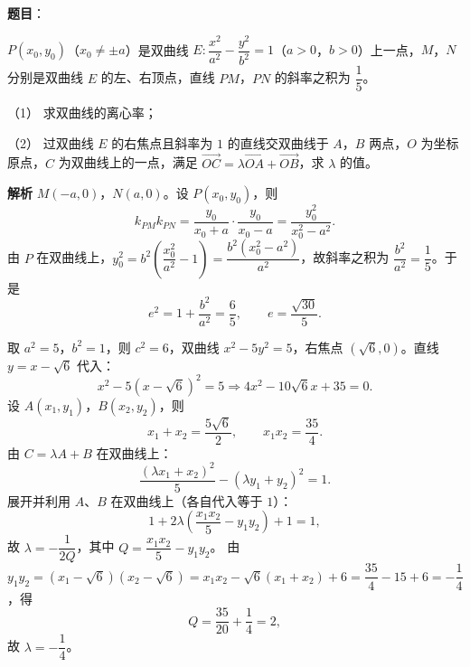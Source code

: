 \begin{answer}

\textbf{题目}：

$P(x_0,y_0)$（$x_0\neq\pm a$）是双曲线 $E:\dfrac{x^2}{a^2}-\dfrac{y^2}{b^2}=1$（$a>0$，$b>0$）上一点，$M$，$N$ 分别是双曲线 $E$ 的左、右顶点，直线 $PM$，$PN$ 的斜率之积为 $\dfrac15$。

（1） 求双曲线的离心率；

（2） 过双曲线 $E$ 的右焦点且斜率为 $1$ 的直线交双曲线于 $A$，$B$ 两点，$O$ 为坐标原点，$C$ 为双曲线上的一点，满足 $\overrightarrow{OC}=\lambda\overrightarrow{OA}+\overrightarrow{OB}$，求 $\lambda$ 的值。

\textbf{解析}
$M(-a,0)$，$N(a,0)$。设 $P(x_0,y_0)$，则
\nopagebreak[4]
\[k_{PM}k_{PN}=\frac{y_0}{x_0+a}\cdot\frac{y_0}{x_0-a}=\frac{y_0^2}{x_0^2-a^2}.\]
由 $P$ 在双曲线上，$y_0^2=b^2\left(\dfrac{x_0^2}{a^2}-1\right)=\dfrac{b^2(x_0^2-a^2)}{a^2}$，故斜率之积为 $\dfrac{b^2}{a^2}=\dfrac15$。于是
\nopagebreak[4]
\[e^2=1+\frac{b^2}{a^2}=\frac65,\qquad e=\frac{\sqrt{30}}5.\]

取 $a^2=5$，$b^2=1$，则 $c^2=6$，双曲线 $x^2-5y^2=5$，右焦点 $(\sqrt6,0)$。直线 $y=x-\sqrt6$ 代入：
\nopagebreak[4]
\[x^2-5(x-\sqrt6)^2=5\Longrightarrow4x^2-10\sqrt6x+35=0.\]
设 $A(x_1,y_1)$，$B(x_2,y_2)$，则
\nopagebreak[4]
\[x_1+x_2=\frac{5\sqrt6}2,\qquad x_1x_2=\frac{35}4.\]
由 $C=\lambda A+B$ 在双曲线上：
\nopagebreak[4]
\[\frac{(\lambda x_1+x_2)^2}5-(\lambda y_1+y_2)^2=1.\]
展开并利用 $A$、$B$ 在双曲线上（各自代入等于 $1$）：
\nopagebreak[4]
\[1+2\lambda\left(\frac{x_1x_2}5-y_1y_2\right)+1=1,\]
故 $\lambda=-\dfrac1{2Q}$，其中 $Q=\dfrac{x_1x_2}5-y_1y_2$。
由 $y_1y_2=(x_1-\sqrt6)(x_2-\sqrt6)=x_1x_2-\sqrt6(x_1+x_2)+6=\dfrac{35}4-15+6=-\dfrac14$，得
\nopagebreak[4]
\[Q=\frac{35}{20}+\frac14=2,\]
故 $\lambda=-\dfrac14$。



\end{answer}

